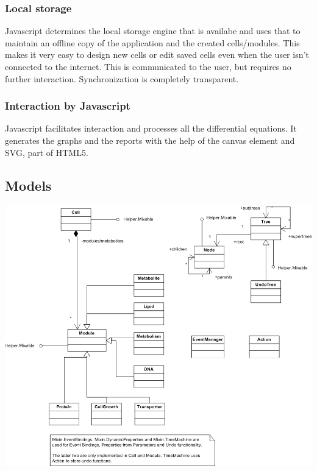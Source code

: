 \documentclass{report}
\begin{document}
				\subsubsection{Local storage}
					Javascript determines the local storage engine that is availabe and uses that to maintain an offline copy of the application and the created cells/modules. This makes it very easy to design new cells or edit saved cells even when the user isn't connected to the internet. This is communicated to the user, but requires no further interaction. Synchronization is completely transparent.
				\subsubsection{Interaction by Javascript}
					Javascript facilitates interaction and processes all the differential equations. It generates the graphs and the reports with the help of the canvas element and SVG, part of HTML5.
					
				\subsection{Models}
					\includegraphics[scale=0.2]{models.png}
				
\end{document}
